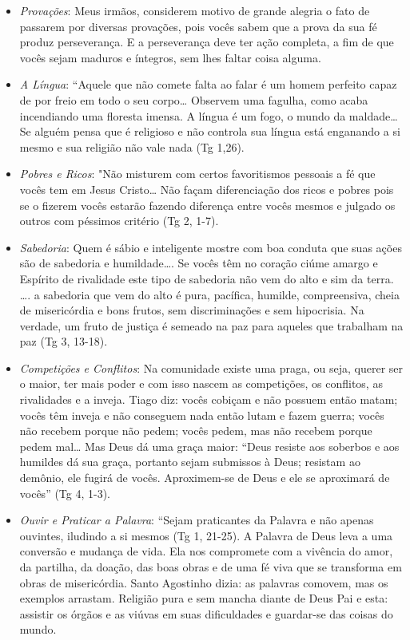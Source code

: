 \documentclass[
]{book}
\begin{document}
\begin{itemize}
\item
  \emph{Provações}: Meus irmãos, considerem motivo de grande alegria o fato de passarem por diversas provações, pois vocês sabem que a prova da sua fé produz perseverança. E a perseverança deve ter ação completa, a fim de que vocês sejam maduros e íntegros, sem lhes faltar coisa alguma.
\item
  \emph{A Língua}: ``Aquele que não comete falta ao falar é um homem perfeito capaz de por freio em todo o seu corpo\ldots{} Observem uma fagulha, como acaba incendiando uma floresta imensa. A língua é um fogo, o mundo da maldade\ldots{} Se alguém pensa que é religioso e não controla sua língua está enganando a si mesmo e sua religião não vale nada (Tg 1,26).
\item
  \emph{Pobres e Ricos}: "Não misturem com certos favoritismos pessoais a fé que vocês tem em Jesus Cristo\ldots{} Não façam diferenciação dos ricos e pobres pois se o fizerem vocês estarão fazendo diferença entre vocês mesmos e julgado os outros com péssimos critério (Tg 2, 1-7).
\item
  \emph{Sabedoria}: Quem é sábio e inteligente mostre com boa conduta que suas ações são de sabedoria e humildade\ldots. Se vocês têm no coração ciúme amargo e Espírito de rivalidade este tipo de sabedoria não vem do alto e sim da terra. \ldots. a sabedoria que vem do alto é pura, pacífica, humilde, compreensiva, cheia de misericórdia e bons frutos, sem discriminações e sem hipocrisia. Na verdade, um fruto de justiça é semeado na paz para aqueles que trabalham na paz (Tg 3, 13-18).
\item
  \emph{Competições e Conflitos}: Na comunidade existe uma praga, ou seja, querer ser o maior, ter mais poder e com isso nascem as competições, os conflitos, as rivalidades e a inveja. Tiago diz: vocês cobiçam e não possuem então matam; vocês têm inveja e não conseguem nada então lutam e fazem guerra; vocês não recebem porque não pedem; vocês pedem, mas não recebem porque pedem mal\ldots{} Mas Deus dá uma graça maior: ``Deus resiste aos soberbos e aos humildes dá sua graça, portanto sejam submissos à Deus; resistam ao demônio, ele fugirá de vocês. Aproximem-se de Deus e ele se aproximará de vocês'' (Tg 4, 1-3).
\item
  \emph{Ouvir e Praticar a Palavra}: ``Sejam praticantes da Palavra e não apenas ouvintes, iludindo a si mesmos (Tg 1, 21-25). A Palavra de Deus leva a uma conversão e mudança de vida. Ela nos compromete com a vivência do amor, da partilha, da doação, das boas obras e de uma fé viva que se transforma em obras de misericórdia. Santo Agostinho dizia: as palavras comovem, mas os exemplos arrastam. Religião pura e sem mancha diante de Deus Pai e esta: assistir os órgãos e as viúvas em suas dificuldades e guardar-se das coisas do mundo.

\end{itemize}
\end{document}
